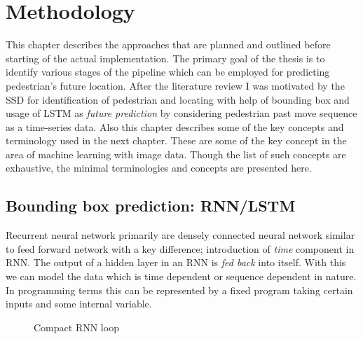 
\chapter{Methodology}
This chapter describes the approaches that are planned and outlined before starting of the actual implementation. The primary goal of the thesis is to identify various stages of the pipeline which can be employed for predicting pedestrian's future location. After the literature review I was motivated by the SSD for identification of pedestrian and locating with help of bounding box and usage of LSTM as \textit{future prediction} by considering pedestrian past move sequence as a time-series data. Also this chapter describes some of the key concepts and terminology used in the next chapter. These are some of the key concept in the area of machine learning with image data. Though the list of such concepts are exhaustive, the minimal terminologies and concepts are presented here.


\section{Bounding box prediction: RNN/LSTM}
Recurrent neural network primarily are densely connected neural network similar to feed forward network with a key difference; introduction of \textit{time} component in RNN. The output of a hidden layer in an RNN is \textit{fed back } into itself. With this we can model the data which is time dependent or sequence dependent in nature. In programming terms this can be represented by a fixed program taking certain inputs and some internal variable.

\begin{figure}[H]
\begin{center}
\caption{Compact RNN loop}
\end{center}
\end{figure}

